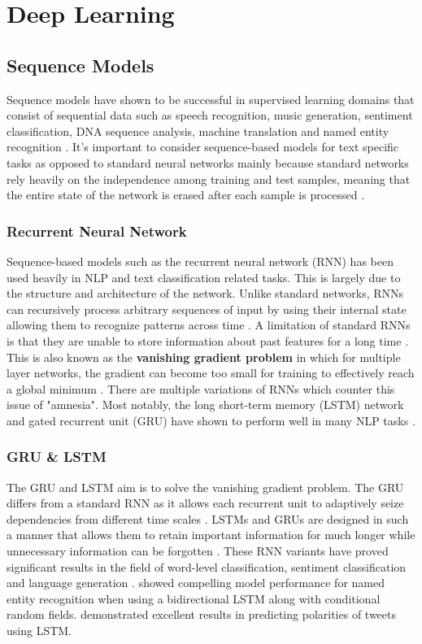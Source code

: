 \section{Deep Learning}

\subsection{Sequence Models}

Sequence models have shown to be successful in supervised learning domains that consist of sequential data such as speech recognition, music generation, sentiment classification, DNA sequence analysis, machine translation and named entity recognition \citep{rnn}. It's important to consider sequence-based models for text specific tasks as opposed to standard neural networks mainly because standard networks rely heavily on the independence among training and test samples, meaning that the entire state of the network is erased after each sample is processed \citep{rnn}. 

\subsubsection{Recurrent Neural Network}

Sequence-based models such as the recurrent neural network (RNN) has been used heavily in NLP and text classification related tasks. This is largely due to the structure and architecture of the network. Unlike standard networks, RNNs can recursively process arbitrary sequences of input by using their internal state allowing them to recognize patterns across time \citep{ghelani_2019}. A limitation of standard RNNs is that they are unable to store information about past features for a long time \citep{sq-generation}. This is also known as the \textbf{vanishing gradient problem} in which for multiple layer networks, the gradient can become too small for training to effectively reach a global minimum \citep{vanishing-grad}. There are multiple variations of RNNs which counter this issue of "amnesia". Most notably, the long short-term memory (LSTM) network and gated recurrent unit (GRU) have shown to perform well in many NLP tasks \citep{pdf:nlpsurvery}. 

\subsubsection{GRU \& LSTM}

The GRU and LSTM aim is to solve the vanishing gradient problem. The GRU differs from a standard RNN as it allows each recurrent unit to adaptively seize dependencies from different time scales \citep{gru}. LSTMs and GRUs are designed in such a manner that allows them to retain important information for much longer while unnecessary information can be forgotten \citep{pdf:nlpsurvery}. These RNN variants have proved significant results in the field of word-level classification, sentiment classification and language generation \citep{nlp-trends}. \cite{NER} showed compelling model performance for named entity recognition when using a bidirectional LSTM along with conditional random fields. \cite{wang-etal-2015-predicting} demonstrated excellent results in predicting polarities of tweets using LSTM. 

